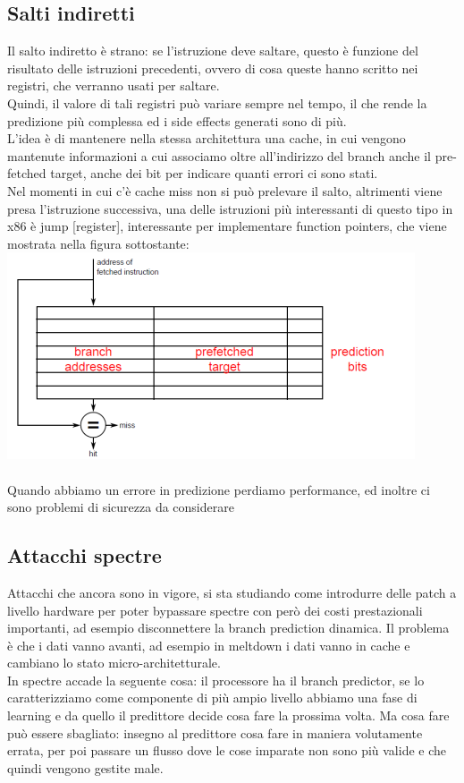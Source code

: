 \documentclass[12pt, oneside]{extbook}
\begin{document}
\subsection{Salti indiretti}
Il salto indiretto è strano: se l'istruzione deve saltare, questo è funzione del risultato delle istruzioni precedenti, ovvero di cosa queste hanno scritto nei registri, che verranno usati per saltare.\\ Quindi, il valore di tali registri può variare sempre nel tempo, il che rende la predizione più complessa ed i side effects generati sono di più.\\ L'idea è di mantenere nella stessa architettura una cache, in cui vengono mantenute informazioni a cui associamo oltre all'indirizzo del branch anche il pre-fetched target, anche dei bit per indicare quanti errori ci sono stati.\\ Nel momenti in cui c'è cache miss non si può prelevare il salto, altrimenti viene presa l'istruzione successiva, una delle istruzioni più interessanti di questo tipo in x86 è \textsf{jump [register]}, interessante per implementare function pointers, che viene mostrata nella figura sottostante:\\
\includegraphics[scale=0.5]{immagini/jmp_reg}\\\\
Quando abbiamo un errore in predizione perdiamo performance, ed inoltre ci sono problemi di sicurezza da considerare
\subsection{Attacchi spectre}
Attacchi che ancora sono in vigore, si sta studiando come introdurre delle patch a livello hardware per poter bypassare spectre con però dei costi prestazionali importanti, ad esempio disconnettere la branch prediction dinamica. Il problema è che i dati vanno avanti, ad esempio in meltdown i dati vanno in cache e cambiano lo stato micro-architetturale.\\ In spectre accade la seguente cosa: il processore ha il branch predictor, se lo caratterizziamo come componente di più ampio livello abbiamo una fase di learning e da quello il predittore decide cosa fare la prossima volta. Ma cosa fare può essere sbagliato: insegno al predittore cosa fare in maniera volutamente errata, per poi passare un flusso dove le cose imparate non sono più valide e che quindi vengono gestite male.
\end{document}
